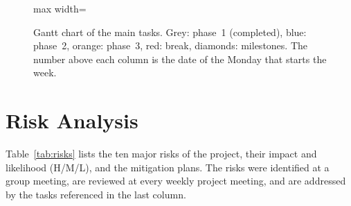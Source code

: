 \documentclass[11pt,a4paper]{article}
\newcounter{growrow}
\newcommand{\gtask}[4]{%
  \node[gann, anchor=east] at (-0.5, {\value{growrow}+0.5}) {#4};%
  \fill[#3, gbar] ({#1-0.78}, {\value{growrow}+0.18}) rectangle ({#2-0.22}, {\value{growrow}+0.82});%
  \stepcounter{growrow}}
\newcommand{\gmile}[2]{%
  \node[gann, anchor=east] at (-0.5, {\value{growrow}+0.5}) {#2};%
  \node[diamond, fill=red!65, draw=black!60, line width=0.3pt, inner sep=1.2pt]%
    at ({#1-0.5}, {\value{growrow}+0.5}) {};%
  \stepcounter{growrow}}
\newcommand{\ggroup}[1]{%
  \fill[black!6] (0,\value{growrow}) rectangle (21,{\value{growrow}+1});%
  \node[gann, font=\footnotesize\bfseries, anchor=west] at (0.15, {\value{growrow}+0.5}) {#1};%
  \stepcounter{growrow}}
\begin{document}
\begin{figure}[H]
\begin{adjustbox}{max width=\textwidth}
\end{adjustbox}
\caption{Gantt chart of the main tasks. Grey: phase~1 (completed), blue:
phase~2, orange: phase~3, red: break, diamonds: milestones. The number above
each column is the date of the Monday that starts the week.}
\label{fig:gantt}
\end{figure}

\clearpage
\section{Risk Analysis}
\label{sec:risks}

Table~\ref{tab:risks} lists the ten major risks of the project, their impact
and likelihood (H/M/L), and the mitigation plans. The risks were identified
at a group meeting, are reviewed at every weekly project meeting, and are
addressed by the tasks referenced in the last column.
\end{document}
